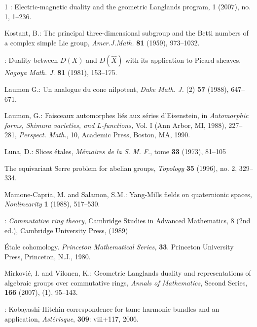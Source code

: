 \documentclass[12pt]{article}
\numberwithin{equation}{section}
\theoremstyle{remark}
\theoremstyle{definition}
\numberwithin{theorem}{section}
\renewcommand{\1}{\mathbbm{1}}
\begin{document}
\begin{thebibliography}{1}
:
\newblock Electric-magnetic duality and the geometric {L}anglands program,   1  (2007),  no. 1, 1--236. 

{\sc Kostant, B.}: {The principal three-dimensional subgroup and the Betti numbers of a complex simple Lie group}, {\em  Amer.J.Math. }{\bf 81} (1959), 973--1032.

:
	Duality between $D(X)$ and $D(\hat{X} )$ with its application to Picard sheaves,
	{\em Nagoya Math. J.} {\bf 81} (1981), 153--175.

 {\sc Laumon G.}: Un analogue du cone nilpotent,
{\em Duke Math. J.} (2) {\bf 57} (1988), 647--671. 

 {\sc Laumon, G.}:
Faisceaux automorphes li\'es aux s\'eries d'Eisenstein, in {\em  Automorphic forms, Shimura varieties, and L-functions,} Vol. I (Ann Arbor, MI, 1988), 227--281,
{\em Perspect. Math.}, 10, Academic Press, Boston, MA, 1990.

 {\sc Luna, D.}:
Slices \'etales,
{\em M\'emoires de la S. M. F.}, tome {\bf 33} (1973),  81--105

The equivariant Serre problem for abelian groups, 
{\em Topology} {\bf 35} (1996), no. 2, 329--334.

{\sc Mamone-Capria, M. {\rm and} Salamon, S.M.}:{ Yang-Mills fields on quaternionic spaces},
{\em Nonlinearity} {\bf 1} (1988), 517--530.

:  {\em Commutative ring theory}, { Cambridge Studies in Advanced Mathematics}, 8 (2nd ed.), Cambridge University Press, (1989)



\'Etale cohomology.
{\em Princeton Mathematical Series,} {\bf 33}. Princeton University Press, Princeton, N.J., 1980.

 {\sc Mirkovi\'c, I. {\rm and} Vilonen, K.}: Geometric Langlands duality and representations of algebraic groups over commutative rings, {\em Annals of Mathematics}, Second Series, {\bf 166} (2007), (1), 95--143.

: Kobayashi-Hitchin correspondence for tame harmonic bundles and an application, {\em Ast\'erisque}, {\bf 309}: viii+117, 2006.


\end{thebibliography}
\end{document}

